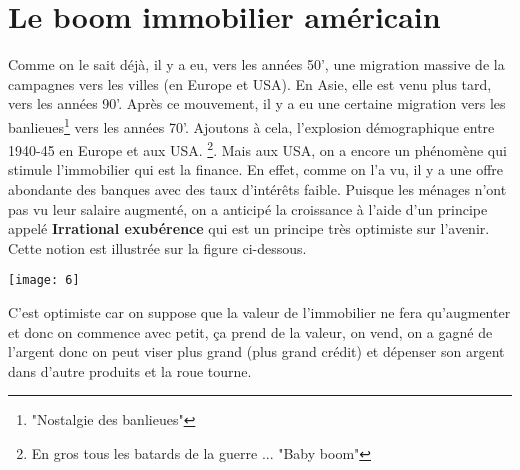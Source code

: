 \section{Le boom immobilier américain}
Comme on le sait déjà, il y a eu, vers les années 50', une migration massive de la campagnes vers les villes (en Europe et USA). En Asie, elle est venu plus tard, vers les années 90'. Après ce mouvement, il y a eu une certaine migration vers les banlieues\footnote{"Nostalgie des banlieues"} vers les années 70'. Ajoutons à cela, l'explosion démographique entre 1940-45 en Europe et aux USA. \footnote{En gros tous les batards de la guerre ... "Baby boom"}. Mais aux USA, on a encore un phénomène qui stimule l'immobilier qui est la finance. En effet, comme on l'a vu, il y a une offre abondante des banques avec des taux d'intérêts faible. Puisque les ménages n'ont pas vu leur salaire augmenté, on a anticipé la croissance à l'aide d'un principe appelé \textbf{Irrational exubérence} qui est un principe très optimiste sur l'avenir. Cette notion est illustrée sur la figure ci-dessous.

\begin{center}
	\texttt{[image: 6]}
\end{center} 

C'est optimiste car on suppose que la valeur de l'immobilier ne fera qu'augmenter et donc on commence avec petit, ça prend de la valeur, on vend, on a gagné de l'argent donc on peut viser plus grand (plus grand crédit) et dépenser son argent dans d'autre produits et la roue tourne.

